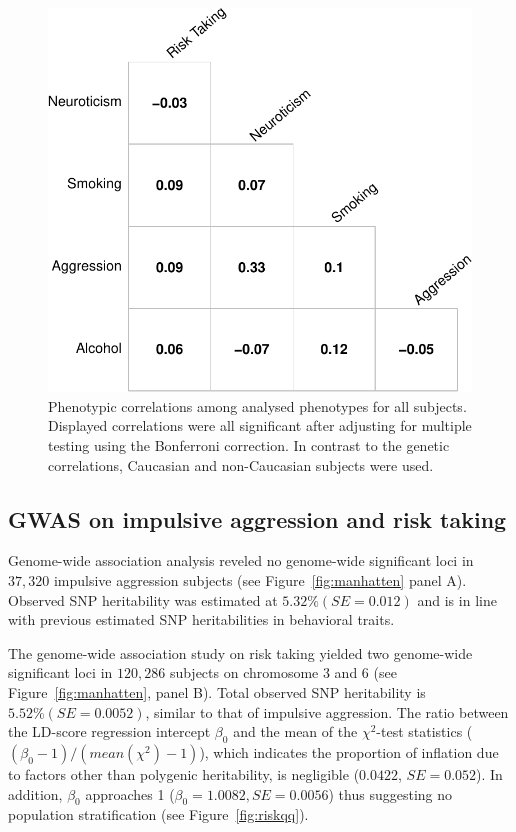 \begin{figure}[htpb]
  \centering
  \includegraphics[width=0.6\linewidth]{figure/phenotype/corr_plot_ci.pdf} 
  \caption{
    Phenotypic correlations among analysed phenotypes for all subjects.
    Displayed correlations were all significant after adjusting for multiple testing using the Bonferroni correction.
    In contrast to the genetic correlations, Caucasian and non-Caucasian subjects were used.
  }\label{fig:corr_pheno}
\end{figure}

\subsection{GWAS on impulsive aggression and risk taking}
\label{sub:gwas}

Genome-wide association analysis reveled no genome-wide significant loci in $37,320$ impulsive aggression subjects (see Figure~\ref{fig:manhatten} panel A).
Observed SNP heritability was estimated at $5.32\% (SE=0.012)$ and is in line with previous estimated SNP heritabilities in behavioral traits.

The genome-wide association study on risk taking yielded two genome-wide significant loci in $120,286$ subjects on chromosome 3 and 6 (see Figure~\ref{fig:manhatten}, panel B).
Total observed SNP heritability is  $5.52\% (SE=0.0052)$, similar to that of impulsive aggression.
The ratio between the LD-score regression intercept $\beta_0$ and the mean of the $\chi^2$-test statistics ($(\beta_0 - 1)/(mean(\chi^2)-1)$),
which indicates the proportion of inflation due to factors other than polygenic heritability, is  negligible ($0.0422$, $SE=0.052$).
In addition, $\beta_0$ approaches 1 ($\beta_0=1.0082, SE=0.0056$) thus suggesting no population stratification (see Figure~\ref{fig:riskqq}).

